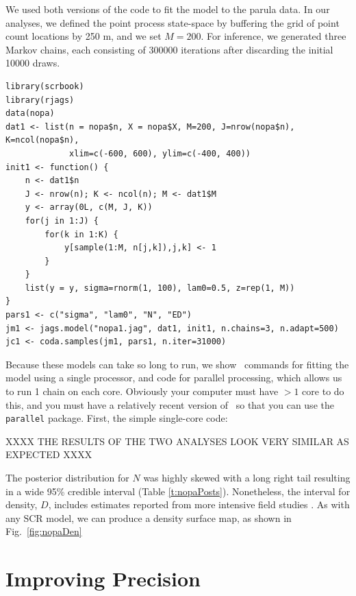 We used both versions of the code to fit the
model to the parula data. In our analyses, we defined the point process
state-space by buffering the grid of point count locations by 250 m,
and we set $M=200$. For inference, we generated three Markov chains,
each consisting of 300000 iterations after discarding the initial 10000
draws. %
\begin{small}
\begin{verbatim}
library(scrbook)
library(rjags)
data(nopa)
dat1 <- list(n = nopa$n, X = nopa$X, M=200, J=nrow(nopa$n), K=ncol(nopa$n),
             xlim=c(-600, 600), ylim=c(-400, 400))
init1 <- function() {
    n <- dat1$n
    J <- nrow(n); K <- ncol(n); M <- dat1$M
    y <- array(0L, c(M, J, K))
    for(j in 1:J) {
        for(k in 1:K) {
            y[sample(1:M, n[j,k]),j,k] <- 1
        }
    }
    list(y = y, sigma=rnorm(1, 100), lam0=0.5, z=rep(1, M))
}
pars1 <- c("sigma", "lam0", "N", "ED")
jm1 <- jags.model("nopa1.jag", dat1, init1, n.chains=3, n.adapt=500)
jc1 <- coda.samples(jm1, pars1, n.iter=31000)
\end{verbatim}
\end{small}




Because these models can take so long to run, we show \R~commands for
fitting the model using a single processor, and code for parallel
processing, which allows us to run 1 chain on each core. Obviously
your computer must have $>1$ core to do this, and you must have a
relatively recent version of \R~so that you can use the {\tt parallel}
package. First, the simple single-core code:




XXXX THE RESULTS OF THE TWO ANALYSES LOOK VERY SIMILAR AS EXPECTED XXXX

The posterior distribution for
$N$ was highly skewed with a long right tail resulting in a wide 95\%
credible interval (Table \ref{t:nopaPosts}). Nonetheless, the interval
for density, $D$, includes estimates reported from more intensive field
studies \citep{moldenhaer_regelski:1996}. As with any SCR model,
we can produce a density surface map, as shown in Fig.~\ref{fig:nopaDen}





\section{Improving Precision}
\label{Sect.precision}


